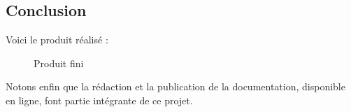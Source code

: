 \documentclass[a4paper, 11pt]{article}
\begin{document}
\subsection{Conclusion}

\par Voici le produit réalisé :

\begin{figure}[H]
\centering
{}
\qquad
{}
\caption{Produit fini}
\end{figure}


\par Notons enfin que la rédaction et la publication de la documentation, disponible en ligne, font partie intégrante de ce projet.
\end{document}
